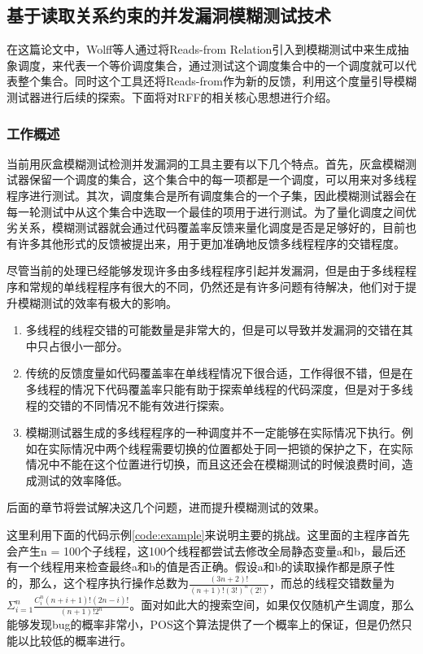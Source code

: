 \subsection{基于读取关系约束的并发漏洞模糊测试技术}

在这篇论文中，Wolff\cite{wolff2024greybox}等人通过将Reads-from Relation引入到模糊测试中来生成抽象调度，来代表一个等价调度集合，通过测试这个调度集合中的一个调度就可以代表整个集合。同时这个工具还将Reads-from作为新的反馈，利用这个度量引导模糊测试器进行后续的探索。下面将对RFF的相关核心思想进行介绍。

\subsubsection{工作概述}

当前用灰盒模糊测试检测并发漏洞的工具主要有以下几个特点。首先，灰盒模糊测试器保留一个调度的集合，这个集合中的每一项都是一个调度，可以用来对多线程程序进行测试。其次，调度集合是所有调度集合的一个子集，因此模糊测试器会在每一轮测试中从这个集合中选取一个最佳的项用于进行测试。为了量化调度之间优劣关系，模糊测试器就会通过代码覆盖率反馈来量化调度是否是足够好的，目前也有许多其他形式的反馈被提出来，用于更加准确地反馈多线程程序的交错程度。

尽管当前的处理已经能够发现许多由多线程程序引起并发漏洞，但是由于多线程程序和常规的单线程程序有很大的不同，仍然还是有许多问题有待解决，他们对于提升模糊测试的效率有极大的影响。
\begin{enumerate}
\item 多线程的线程交错的可能数量是非常大的，但是可以导致并发漏洞的交错在其中只占很小一部分。
\item 传统的反馈度量如代码覆盖率在单线程情况下很合适，工作得很不错，但是在多线程的情况下代码覆盖率只能有助于探索单线程的代码深度，但是对于多线程的交错的不同情况不能有效进行探索。
\item 模糊测试器生成的多线程程序的一种调度并不一定能够在实际情况下执行。例如在实际情况中两个线程需要切换的位置都处于同一把锁的保护之下，在实际情况中不能在这个位置进行切换，而且这还会在模糊测试的时候浪费时间，造成测试的效率降低。
\end{enumerate}

后面的章节将尝试解决这几个问题，进而提升模糊测试的效果。

这里利用下面的代码示例\autoref{code:example}来说明主要的挑战。这里面的主程序首先会产生n = 100个子线程，这100个线程都尝试去修改全局静态变量a和b，最后还有一个线程用来检查最终a和b的值是否正确。假设a和b的读取操作都是原子性的，那么，这个程序执行操作总数为$\frac{(3n+2)!}{(n+1)!(3!)^n(2!)}$，而总的线程交错数量为$\Sigma^n_{i=1}\frac{C_i^n(n+i+1)!(2n-i)!}{(n+1)!2^n}$。面对如此大的搜索空间，如果仅仅随机产生调度，那么能够发现bug的概率非常小，POS这个算法提供了一个概率上的保证，但是仍然只能以比较低的概率进行。

